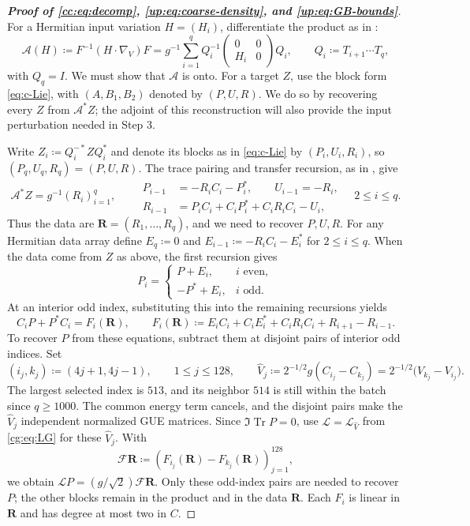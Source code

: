 \documentclass[11pt]{article}
\numberwithin{equation}{section}
\theoremstyle{remark}
\newcommand{\Tr}{\operatorname{Tr}}
\begin{document}
\begin{proof}[\textbf{Proof of \eqref{cc:eq:decomp}, \eqref{up:eq:coarse-density}, and \eqref{up:eq:GB-bounds}}]
For a Hermitian input variation $H=(H_i)$, differentiate the product
as in \cite[Claim~4.5]{Drogin}:
\begin{equation}\label{eq:c-differential}
 \mathcal A(H)\coloneqq F^{-1}(H\cdot\nabla_V)F
 =g^{-1}\sum_{i=1}^qQ_i^{-1}
       \begin{pmatrix}0&0\\H_i&0\end{pmatrix}Q_i,
 \qquad Q_i\coloneqq T_{i+1}\cdots T_q,
\end{equation}
with $Q_q=I$. We must show that $\mathcal A$ is onto.
For a target $Z$, use the block form \eqref{eq:c-Lie}, with
$(A,B_1,B_2)$ denoted by $(P,U,R)$.
We do so by recovering every $Z$ from $\mathcal A^*Z$; the adjoint of this
reconstruction will also provide the input perturbation needed in
Step 3.

Write $Z_i\coloneqq Q_i^{-*}ZQ_i^*$ and denote its blocks as in
\eqref{eq:c-Lie} by $(P_i,U_i,R_i)$, so
$(P_q,U_q,R_q)=(P,U,R)$. The trace pairing and transfer recursion,
as in \cite[Proposition~4.4, pp.~34--35]{Drogin}, give
\begin{equation}\label{eq:c-observe}
 \mathcal A^*Z=g^{-1}(R_i)_{i=1}^q,\qquad
 \begin{aligned}
 P_{i-1}&=-R_iC_i-P_i^*,\qquad
 U_{i-1}=-R_i,\\
 R_{i-1}&=P_iC_i+C_iP_i^*+C_iR_iC_i-U_i,
 \end{aligned}
 \quad 2\le i\le q.
\end{equation}
Thus the data are $\mathbf R=(R_1,\ldots,R_q)$, and we need to recover
$P,U,R$. For any Hermitian data array define
$E_q\coloneqq0$ and $E_{i-1}\coloneqq-R_iC_i-E_i^*$ for $2\le i\le q$.
When the data come from $Z$ as above, the first recursion gives
\[
 P_i=\begin{cases}P+E_i,&i\text{ even},\\-P^*+E_i,&i\text{ odd}.
 \end{cases}
\]
At an interior odd index, substituting this into the remaining
recursions yields
\begin{equation}\label{eq:c-pair}
 C_iP+P^*C_i=F_i(\mathbf R),\qquad
 F_i(\mathbf R)\coloneqq E_iC_i+C_iE_i^*+C_iR_iC_i+R_{i+1}-R_{i-1}.
\end{equation}
To recover $P$ from these equations, subtract them at disjoint pairs
of interior odd indices. Set
\[
 (i_j,k_j)\coloneqq(4j+1,4j-1),\qquad 1\le j\le128,\qquad
 \widehat V_j\coloneqq2^{-1/2} g(C_{i_j}-C_{k_j})
       =2^{-1/2}\bigl(V_{k_j}-V_{i_j}\bigr).
\]
The largest selected index is $513$, and its neighbor $514$ is still
within the batch since $q\ge1000$. The common energy term cancels,
and the disjoint pairs make the $\widehat V_j$ independent normalized GUE matrices.
Since $\Im\Tr P=0$, use $\mathcal L=\mathcal L_{\widehat V}$ from
\eqref{cg:eq:LG} for these $\widehat V_j$.
With
\[
 \mathcal F\mathbf R\coloneqq
       (F_{i_j}(\mathbf R)-F_{k_j}(\mathbf R))_{j=1}^{128},
\]
we obtain $\mathcal LP=(g/\sqrt2)\mathcal F\mathbf R$.
Only these odd-index pairs are needed to recover $P$; the other
blocks remain in the product and in the data $\mathbf R$.
Each $F_i$ is linear in $\mathbf R$ and has degree at most two in $C$.


\end{proof}
\end{document}
